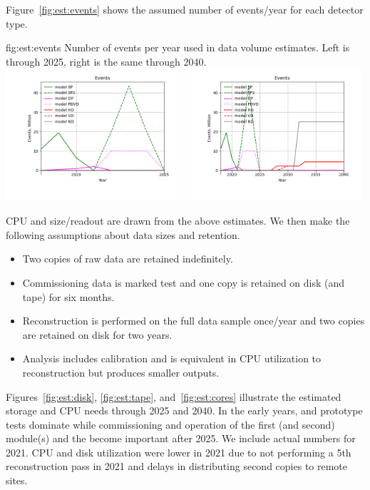 \documentclass[../main-v1.tex]{subfiles}
\begin{document}
Figure~\ref{fig:est:events} shows the assumed number of events/year for each detector type.  

\begin{dunefigure}
{fig:est:events}
{Number of events per year used in data volume estimates. Left is through 2025, right is the same through 2040.  }
\includegraphics[width=0.49\textwidth]{graphics/IntroFigures/2025/Parameters_2022-03-04-2025-Events.png}
\includegraphics[width=0.49\textwidth]{graphics/IntroFigures/2040/Parameters_2022-03-04-2040-Events.png}
\end{dunefigure}

CPU and size/readout are drawn from the above estimates. We then make the following assumptions about data sizes and retention.  

\begin{itemize}
\item Two copies of raw data are retained indefinitely.
\item Commissioning data is marked test and one copy is retained on disk (and tape) for six months. 
\item Reconstruction is performed on the full data sample once/year and two copies are retained on disk for two years.  
\item Analysis includes calibration and is  equivalent in CPU utilization to reconstruction but produces smaller outputs. 
\end{itemize}

Figures~\ref{fig:est:disk}, \ref{fig:est:tape}, and~\ref{fig:est:cores} illustrate the estimated storage and CPU needs through 2025 and 2040.  In the early years,  and  prototype tests dominate while commissioning and operation of the first (and second)  module(s) and the  become important after 2025. We include actual numbers for 2021. CPU and disk utilization were lower in 2021 due to not performing a 5th reconstruction pass in 2021 and delays in distributing second copies to remote sites. 
\end{document}

